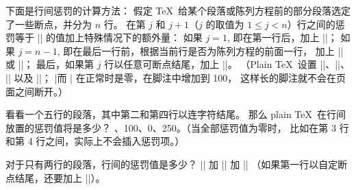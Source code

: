 \danger 下面是行间惩罚的计算方法：
假定 \TeX\ 给某个段落或陈列方程前的部分段落选定了一些断点，并分为 $n$ 行。
在第 $j$ 和 $j+1$（$j$ 的取值为 $1\le j<n$）行之间的惩罚等于
|\interlinepenalty| 的值加上特殊情况下的额外量：
如果 $j=1$, 即在第一行后，加上 |\clubpenalty|；
如果 $j=n-1$, 即在最后一行前，根据当前行是否为陈列方程的前面一行，
加上 |\displaywidowpenalty| 或 |\widowpenalty|；
最后，如果第 $j$ 行以任意可断点结尾，加上 |\brokenpenalty|。%
（Plain \TeX\ 设置 ||、||、
|| 以及 ||；
\1|而 \interlinepenalty| 在正常时是零，在脚注中增加到 100，
这样长的脚注就不会在页面之间断开。）

\dangerexercise 看看一个五行的段落，其中第二和第四行以连字符结尾。%
那么 plain \TeX\ 在行间放置的惩罚值将是多少？
、100、0、250。（当全部惩罚值为零时，
比如在第 3 行和第 4 行之间，实际上不会插入惩罚项。）

\dangerexercise 对于只有两行的段落，行间的惩罚值是多少？
\answer |\interlinepenalty| 加 |\clubpenalty| 加 |\widowpenalty|%
（如果第一行以自定断点结尾，还要加上 |\brokenpenalty|）。

